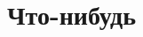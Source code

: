 \documentclass[a4paper,14pt,russian]{extreport}
\begin{document}
\chapter{Что-нибудь}
\end{document}
